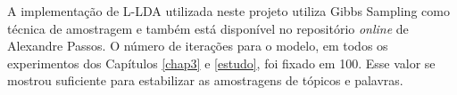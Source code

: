 A implementação de L-LDA utilizada neste projeto utiliza Gibbs Sampling como técnica de amostragem e também está disponível no repositório \emph{online} de Alexandre Passos. O número de iterações para o modelo, em todos os experimentos dos Capítulos \ref{chap3} e \ref{estudo}, foi fixado em 100. Esse valor se mostrou suficiente para estabilizar as amostragens de tópicos e palavras.













